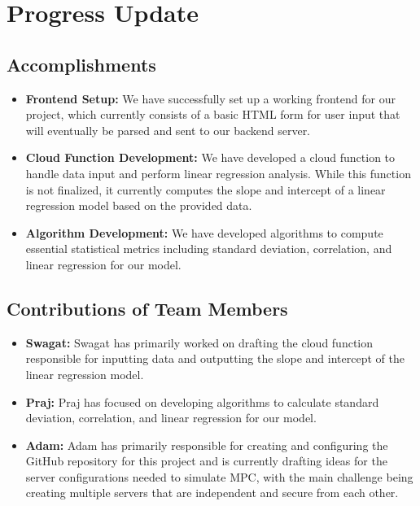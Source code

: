 \documentclass[conference]{IEEEtran}
\begin{document}
\section{Progress Update}

\subsection*{Accomplishments}

\begin{itemize}
    \item \textbf{Frontend Setup:} We have successfully set up a working frontend for our project, which currently consists of a basic HTML form for user input that will eventually be parsed and sent to our backend server. 
    
    \item \textbf{Cloud Function Development:} We have developed a cloud function to handle data input and perform linear regression analysis. While this function is not finalized, it currently computes the slope and intercept of a linear regression model based on the provided data. 
    
    \item \textbf{Algorithm Development:} We have developed algorithms to compute essential statistical metrics including standard deviation, correlation, and linear regression for our model.~\cite{MPC1}
\end{itemize}

\subsection*{Contributions of Team Members}

\begin{itemize}
    \item \textbf{Swagat:} Swagat has primarily worked on drafting the cloud function responsible for inputting data and outputting the slope and intercept of the linear regression model.
    
    \item \textbf{Praj:} Praj has focused on developing algorithms to calculate standard deviation, correlation, and linear regression for our model.

    \item \textbf{Adam:} Adam has primarily responsible for creating and configuring the GitHub repository for this project and is currently drafting ideas for the server configurations needed to simulate MPC, with the main challenge being creating multiple servers that are independent and secure from each other. 
\end{itemize}
\end{document}
